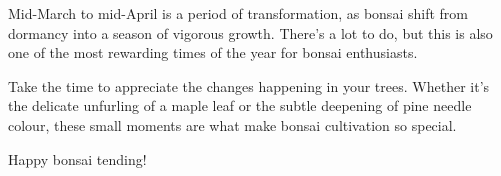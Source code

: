 \medskip

\noindent
Mid\--March to mid\--April is a period of transformation, as bonsai shift from dormancy into a season of vigorous growth.
There's a lot to do, but this is also one of the most rewarding times of the year for bonsai enthusiasts.

Take the time to appreciate the changes happening in your trees.
Whether it's the delicate unfurling of a maple leaf or the subtle deepening of pine needle colour, these small moments are what make bonsai cultivation so special.

Happy bonsai tending!

\closearticle

\columnbreak

